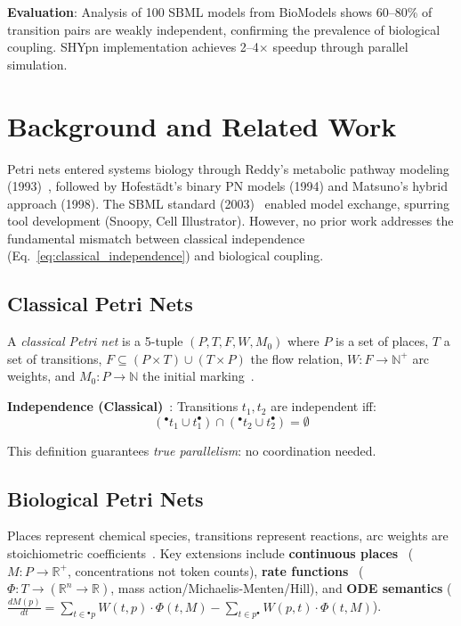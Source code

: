 \documentclass[twocolumn,11pt]{article}
\newcommand{\preset}[1]{\ensuremath{{}^{\bullet}#1}}
\newcommand{\postset}[1]{\ensuremath{#1^{\bullet}}}
\begin{document}
\textbf{Evaluation}: Analysis of 100 SBML models from BioModels shows 60--80\% of transition pairs are weakly independent, confirming the prevalence of biological coupling. SHYpn implementation achieves 2--4$\times$ speedup through parallel simulation.

\section{Background and Related Work}

Petri nets entered systems biology through Reddy's metabolic pathway modeling (1993)~\cite{Reddy1993}, followed by Hofestädt's binary PN models (1994) and Matsuno's hybrid approach (1998). The SBML standard (2003)~\cite{Hucka2003} enabled model exchange, spurring tool development (Snoopy, Cell Illustrator). However, no prior work addresses the fundamental mismatch between classical independence (Eq.~\ref{eq:classical_independence}) and biological coupling.

\subsection{Classical Petri Nets}

A \emph{classical Petri net} is a 5-tuple $(P, T, F, W, M_0)$ where $P$ is a set of places, $T$ a set of transitions, $F \subseteq (P \times T) \cup (T \times P)$ the flow relation, $W: F \to \mathbb{N}^+$ arc weights, and $M_0: P \to \mathbb{N}$ the initial marking~\cite{Murata1989}.

\textbf{Independence (Classical)}~\cite{Reisig2013}: Transitions $t_1, t_2$ are independent iff:
\begin{equation}
(\preset{t_1} \cup \postset{t_1}) \cap (\preset{t_2} \cup \postset{t_2}) = \emptyset
\label{eq:classical_independence}
\end{equation}

This definition guarantees \emph{true parallelism}: no coordination needed.

\subsection{Biological Petri Nets}

Places represent chemical species, transitions represent reactions, arc weights are stoichiometric coefficients~\cite{Reddy1993}. Key extensions include \textbf{continuous places}~\cite{Heiner2008} ($M: P \to \mathbb{R}^+$, concentrations not token counts), \textbf{rate functions}~\cite{Gilbert2006} ($\Phi: T \to (\mathbb{R}^n \to \mathbb{R})$, mass action/Michaelis-Menten/Hill), and \textbf{ODE semantics} ($\frac{dM(p)}{dt} = \sum_{t \in \preset{p}} W(t,p) \cdot \Phi(t, M) - \sum_{t \in \postset{p}} W(p,t) \cdot \Phi(t, M)$).
\end{document}
